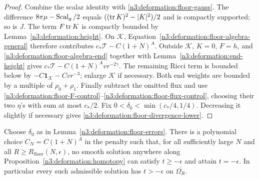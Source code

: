 \begin{proof}
Combine the scalar identity with \eqref{n3:deformation:floor-gauss}.
The difference $8\pi\mu-\operatorname{Scal}_g/2$ equals
$((\operatorname{tr} K)^2-|K|^2)/2$ and is compactly supported; so is $J$.
The term $F\operatorname{tr} K$ is compactly bounded by Lemma~\ref{n3:deformation:height}.
On $\mathcal K$, Equation~\eqref{n3:deformation:floor-algebra-general}
therefore contributes $c_*\mathcal T-C(1+N)^A$.
Outside $\mathcal K$, $K=0$, $F=h$, and
\eqref{n3:deformation:floor-algebra-end} together with
Lemma~\ref{n3:deformation:end-height} gives
$c_*\mathcal T-C(1+N)^Av r^{-2\gamma}$.
The remaining Ricci term is bounded below by
$-C\mathbf1_{\mathcal K}-Cv r^{-3}$; enlarge $\mathcal K$ if necessary.
Both end weights are bounded by a multiple of $\rho_0+\rho_1$.
Finally subtract the omitted flux and use
\eqref{n3:deformation:floor-F-control}--\eqref{n3:deformation:floor-flux-control},
choosing their two $\eta$'s with sum at most $c_*/2$.
Fix $0<\delta_0<\min(c_*/4,1/4)$. Decreasing it slightly if necessary
gives \eqref{n3:deformation:floor-divergence-lower}.
\end{proof}

\begin{proposition}\label{n3:deformation:floor}
Choose $\delta_0$ as in Lemma~\ref{n3:deformation:floor-errors}.
There is a polynomial choice $C_N=C(1+N)^A$ in the penalty such that,
for all sufficiently large $N$ and all
$R\ge R_{\mathrm{floor}}(N,\epsilon)$, no smooth solution anywhere along
Proposition~\ref{n3:deformation:homotopy} can satisfy $t\ge-\epsilon$
and attain $t=-\epsilon$.
In particular every such admissible solution has $t>-\epsilon$ on
$\overline{\Omega_R}$.
\end{proposition}

